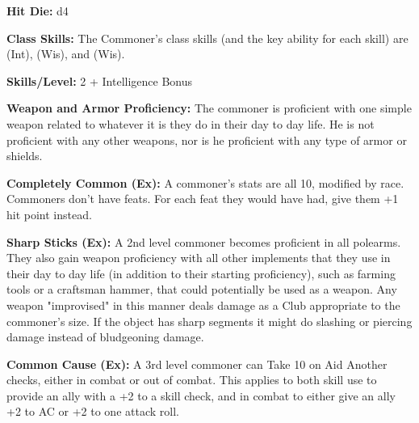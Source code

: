 
\textbf{Hit Die:} d4

\textbf{Class Skills:} The Commoner's class skills (and the key ability for each skill) are  (Int),  (Wis), and  (Wis).

\textbf{Skills/Level:} 2 + Intelligence Bonus

\poorbab
\poorfor
\poorref
\poorwil

\begin{classtable}
\end{classtable}

\classfeatures

\textbf{Weapon and Armor Proficiency:} The commoner is proficient with one simple weapon related to whatever it is they do in their day to day life. He is not proficient with any other weapons, nor is he proficient with any type of armor or shields.

\textbf{Completely Common (Ex):} A commoner's stats are all 10, modified by race. Commoners don't have feats. For each feat they would have had, give them +1 hit point instead.

\textbf{Sharp Sticks (Ex):} A 2nd level commoner becomes proficient in all polearms. They also gain weapon proficiency with all other implements that they use in their day to day life (in addition to their starting proficiency), such as farming tools or a craftsman hammer, that could potentially be used as a weapon. Any weapon "improvised" in this manner deals damage as a Club appropriate to the commoner's size. If the object has sharp segments it might do slashing or piercing damage instead of bludgeoning damage.

\textbf{Common Cause (Ex):} A 3rd level commoner can Take 10 on Aid Another checks, either in combat or out of combat. This applies to both skill use to provide an ally with a +2 to a skill check, and in combat to either give an ally +2 to AC or +2 to one attack roll.